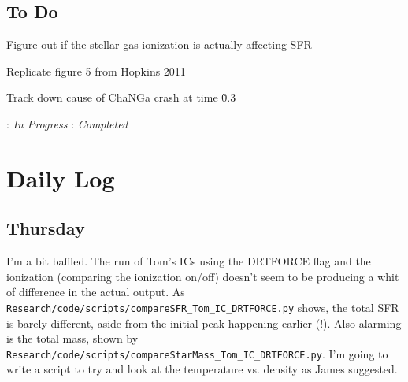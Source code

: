 \documentclass[11pt,letterpaper]{article}
\begin{document}
\subsection*{To Do}
\begin{bullets}
\item Figure out if the stellar gas ionization is actually affecting SFR
\item[\textleaf] Replicate figure 5 from Hopkins 2011
\item Track down cause of ChaNGa crash at time \~0.3
\end{bullets}

\textleaf : \textit{In Progress} \qquad \checkmark : \textit{Completed}

\section*{Daily Log}
\subsection*{Thursday}
I'm a bit baffled.  The run of Tom's ICs using the DRTFORCE flag and the 
ionization (comparing the ionization on/off) doesn't seem to be producing a whit
of difference in the actual output.  As 
\verb!Research/code/scripts/compareSFR_Tom_IC_DRTFORCE.py! shows, the total
SFR is barely different, aside from the initial peak happening earlier (!).  
Also alarming is the total mass, shown by 
\verb!Research/code/scripts/compareStarMass_Tom_IC_DRTFORCE.py!.  I'm going to
write a script to try and look at the temperature vs. density as James 
suggested.\\
\end{document}
